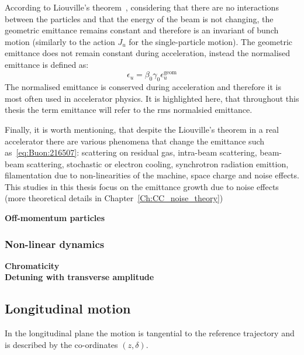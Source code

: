 According to Liouville’s theorem~\cite{wolski2014}, considering that there are no interactions between the particles and that the energy of the beam is not changing, the geometric emittance remains constant and therefore is an invariant of bunch motion (similarly to the action $J_u$ for the single-particle motion). The geometric emittance does not remain constant during acceleration, instead the normalised emittance is defined as:
\begin{equation}\label{eq:normalised_emittance}
    \epsilon_u = \beta_0 \gamma_0 \epsilon^{\mathrm{geom}}_u
\end{equation}
The normalised emittance is conserved during acceleration and therefore it is most often used in accelerator physics. It is highlighted here, that throughout this thesis the term emittance will refer to the rms normalsied emittance.

Finally, it is worth mentioning, that despite the  Liouville’s theorem in a real accelerator there are various phenomena that change the emittance such as~\ref{eq:Buon:216507}: scattering on residual gas, intra-beam scattering, beam-beam scattering, stochastic or electron cooling, synchrotron radiation emittion, filamentation due to non-linearities of the machine, space charge and noise effects. This studies in this thesis focus on the emittance growth due to noise effects (more theoretical details in Chapter~\ref{Ch:CC_noise_theory})






\textbf{Off-momentum particles}

\subsubsection{Non-linear dynamics}
\textbf{Chromaticity}\\

\textbf{Detuning with transverse amplitude}\\

\subsection{Longitudinal motion}
In the longitudinal plane the motion is tangential to the reference trajectory and is described by the co-ordinates $(z, \delta)$. 



